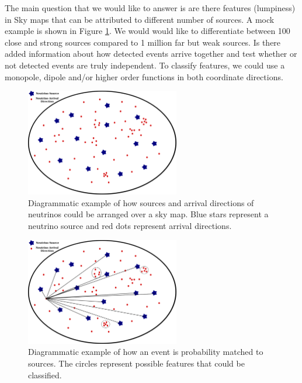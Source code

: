 \documentclass[a4paper,12pt,twoside,openright]{article}
\begin{document}
The main question that we would like to answer is are there features (lumpiness) in Sky maps that can be attributed to different number of sources. A mock example is shown in Figure \ref{fig:SourceEventEx}. We would would like to differentiate between 100 close and strong sources compared to 1 million far but weak sources. Is there added information about how detected events arrive together and test whether or not detected events are truly independent. To classify features, we could use a monopole, dipole and/or higher order functions in both coordinate directions.


\begin{figure}[!h]
\centering
\includegraphics[width=0.6\textwidth]{MockNeutrinoMap.png}
\caption{Diagrammatic example of how sources and arrival directions of neutrinos could be arranged over a sky map. Blue stars represent a neutrino source and red dots represent arrival directions.}
\label{fig:SourceEventEx}
\end{figure}

\begin{figure}[h]
\centering
\includegraphics[width=0.6\textwidth]{MockNeutrinoMap_clumpAndDirection.png}
\caption{Diagrammatic example of how an event is probability matched to sources. The circles represent possible features that could be classified.}
\label{fig:SourceEventClump}
\end{figure}
\end{document}
